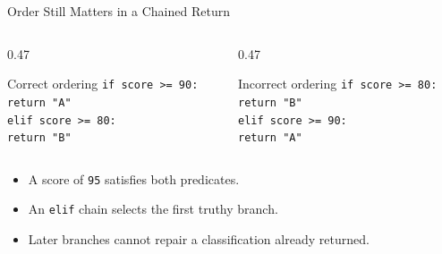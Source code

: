 \documentclass[aspectratio=169,10pt]{beamer}
\begin{document}
\begin{frame}{Order Still Matters in a Chained Return}
  \begin{columns}[T,onlytextwidth]
    \begin{column}{0.47\textwidth}
      \begin{block}{Correct ordering}
        \texttt{if score >= 90:}\\
        \hspace*{0.20in}\texttt{return "A"}\\
        \texttt{elif score >= 80:}\\
        \hspace*{0.20in}\texttt{return "B"}
      \end{block}
    \end{column}

    \begin{column}{0.47\textwidth}
      \begin{block}{Incorrect ordering}
        \texttt{if score >= 80:}\\
        \hspace*{0.20in}\texttt{return "B"}\\
        \texttt{elif score >= 90:}\\
        \hspace*{0.20in}\texttt{return "A"}
      \end{block}
    \end{column}
  \end{columns}

  \begin{itemize}
    \item A score of \texttt{95} satisfies both predicates.
    \item An \texttt{elif} chain selects the first truthy branch.
    \item Later branches cannot repair a classification already returned.
  \end{itemize}
\end{frame}
\end{document}

